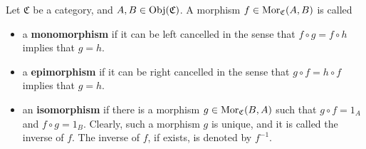 
\vskip 0.5cm
\begin{definition}
\mbox{}
\vskip 0.1cm
\noindent
Let $\mathfrak{C}$ be a category, and $A, B \in \textnormal{Obj}(\mathfrak{C})$.
A morphism $f \in \textnormal{Mor}_{\mathfrak{C}}(A,B)$ is called
\begin{itemize}
\item
	a \textbf{monomorphism} if it can be {\color{red}left} cancelled in the sense that
	$f \circ g = f \circ h$  implies that $g = h$.
\item
	a \textbf{epimorphism} if it can be {\color{red}right} cancelled in the sense that
	$g \circ f = h \circ f$  implies that $g = h$.
\item
	an \textbf{isomorphism} if there is a morphism $g \in \textnormal{Mor}_{\mathfrak{C}}(B,A)$
	such that $g \circ f = 1_{A}$ and $f \circ g = 1_{B}$.
	Clearly, such a morphism $g$ is unique, and it is called the inverse of $f$.
	The inverse of $f$, if exists, is denoted by $f^{-1}$.
\end{itemize}
\end{definition}

